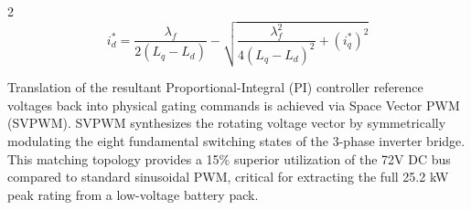 \begin{multicols}{2}
\begin{equation} \label{eq:ipm_mtpa}
i_d^* = \frac{\lambda_f}{2(L_q - L_d)} - \sqrt{ \frac{\lambda_f^2}{4(L_q - L_d)^2} + (i_q^*)^2 }
\end{equation}

Translation of the resultant Proportional-Integral (PI) controller reference voltages back into physical gating commands is achieved via Space Vector PWM (SVPWM). SVPWM synthesizes the rotating voltage vector by symmetrically modulating the eight fundamental switching states of the 3-phase inverter bridge. This matching topology provides a 15\% superior utilization of the 72V DC bus compared to standard sinusoidal PWM, critical for extracting the full 25.2 kW peak rating from a low-voltage battery pack.
\end{multicols}
